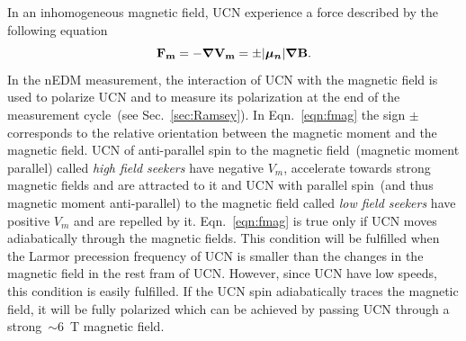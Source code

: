 In an inhomogeneous magnetic field, UCN experience a force described
by the following equation
\begin{equation}
  \label{eqn:fmag}
  \bf{F_m} = - \boldsymbol{\nabla}V_m = \pm \vert \boldsymbol{\mu_n} \vert \boldsymbol{\nabla} \bf{B}.
\end{equation}
In the nEDM measurement, the interaction of UCN with the magnetic
field is used to polarize UCN and to measure its polarization at the
end of the measurement cycle~(see Sec.~\ref{sec:Ramsey}).  In
Eqn.~\ref{eqn:fmag} the sign $\pm$ corresponds to the relative
orientation between the magnetic moment and the magnetic field.  UCN
of anti-parallel spin to the magnetic field~(magnetic moment parallel)
called {\it{high field seekers}} have negative $V_m$, accelerate
towards strong magnetic fields and are attracted to it and UCN with
parallel spin~(and thus magnetic moment anti-parallel) to the magnetic
field called {\it{low field seekers}} have positive $V_m$ and are
repelled by it.  Eqn.~\ref{eqn:fmag} is true only if UCN moves
adiabatically through the magnetic fields. This condition will be
fulfilled when the Larmor precession frequency of UCN is smaller than
the changes in the magnetic field in the rest fram of UCN. However,
since UCN have low speeds, this condition is easily fulfilled.  If the
UCN spin adiabatically traces the magnetic field, it will be fully
polarized which can be achieved by passing UCN through a
strong~$\sim 6$~T magnetic field.




